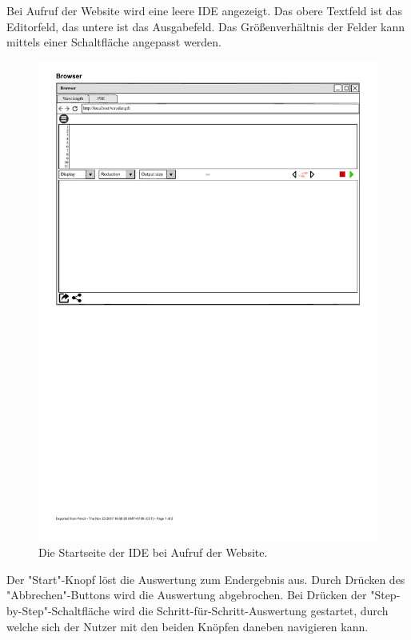 \documentclass[parskip=full,11pt,twoside]{scrartcl}
\begin{document}

Bei Aufruf der Website wird eine leere IDE angezeigt. Das obere Textfeld ist das Editorfeld, das untere ist das Ausgabefeld. Das Größenverhältnis der Felder kann mittels einer Schaltfläche angepasst werden.

\begin{figure}[H]
	\centering
	\includegraphics[width = \textwidth]{img/startseite}
	\caption{Die Startseite der IDE bei Aufruf der Website.} 
	\label{img:start}
\end{figure}


Der "Start"-Knopf löst die Auswertung zum Endergebnis aus. Durch Drücken des "Abbrechen"-Buttons wird die Auswertung abgebrochen. Bei Drücken der "Step-by-Step"-Schaltfläche wird die Schritt-für-Schritt-Auswertung gestartet, durch welche sich der Nutzer mit den beiden Knöpfen daneben navigieren kann.
\end{document}
